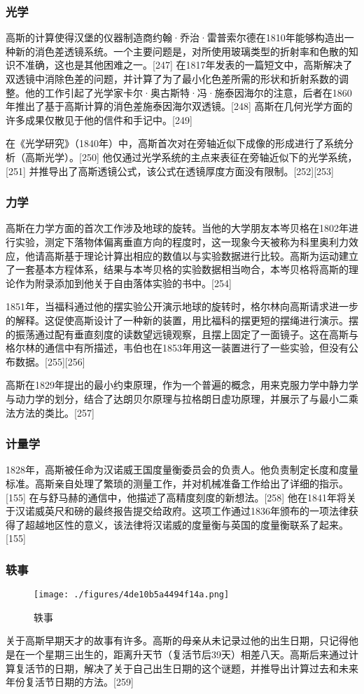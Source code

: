 \subsubsection{光学}
高斯的计算使得汉堡的仪器制造商约翰·乔治·雷普索尔德在1810年能够构造出一种新的消色差透镜系统。一个主要问题是，对所使用玻璃类型的折射率和色散的知识不准确，这也是其他困难之一。[247] 在1817年发表的一篇短文中，高斯解决了双透镜中消除色差的问题，并计算了为了最小化色差所需的形状和折射系数的调整。他的工作引起了光学家卡尔·奥古斯特·冯·施泰因海尔的注意，后者在1860年推出了基于高斯计算的消色差施泰因海尔双透镜。[248] 高斯在几何光学方面的许多成果仅散见于他的信件和手记中。[249]

在《光学研究》（1840年）中，高斯首次对在旁轴近似下成像的形成进行了系统分析（高斯光学）。[250] 他仅通过光学系统的主点来表征在旁轴近似下的光学系统，[251] 并推导出了高斯透镜公式，该公式在透镜厚度方面没有限制。[252][253]
\subsubsection{力学} 
高斯在力学方面的首次工作涉及地球的旋转。当他的大学朋友本岑贝格在1802年进行实验，测定下落物体偏离垂直方向的程度时，这一现象今天被称为科里奥利力效应，他请高斯基于理论计算出相应的数值以与实验数据进行比较。高斯为运动建立了一套基本方程体系，结果与本岑贝格的实验数据相当吻合，本岑贝格将高斯的理论作为附录添加到他关于自由落体实验的书中。[254]

1851年，当福科通过他的摆实验公开演示地球的旋转时，格尔林向高斯请求进一步的解释。这促使高斯设计了一种新的装置，用比福科的摆更短的摆绳进行演示。摆的振荡通过配有垂直刻度的读数望远镜观察，且摆上固定了一面镜子。这在高斯与格尔林的通信中有所描述，韦伯也在1853年用这一装置进行了一些实验，但没有公布数据。[255][256]

高斯在1829年提出的最小约束原理，作为一个普遍的概念，用来克服力学中静力学与动力学的划分，结合了达朗贝尔原理与拉格朗日虚功原理，并展示了与最小二乘法方法的类比。[257]
\subsubsection{计量学} 
1828年，高斯被任命为汉诺威王国度量衡委员会的负责人。他负责制定长度和度量标准。高斯亲自处理了繁琐的测量工作，并对机械准备工作给出了详细的指示。[155] 在与舒马赫的通信中，他描述了高精度刻度的新想法。[258] 他在1841年将关于汉诺威英尺和磅的最终报告提交给政府。这项工作通过1836年颁布的一项法律获得了超越地区性的意义，该法律将汉诺威的度量衡与英国的度量衡联系了起来。[155]
\subsubsection{轶事}
\begin{figure}[ht]
\centering
\texttt{[image: ./figures/4de10b5a4494f14a.png]}
\caption{轶事} \label{fig_KRGS_24}
\end{figure}
关于高斯早期天才的故事有许多。高斯的母亲从未记录过他的出生日期，只记得他是在一个星期三出生的，距离升天节（复活节后39天）相差八天。高斯后来通过计算复活节的日期，解决了关于自己出生日期的这个谜题，并推导出计算过去和未来年份复活节日期的方法。[259]


